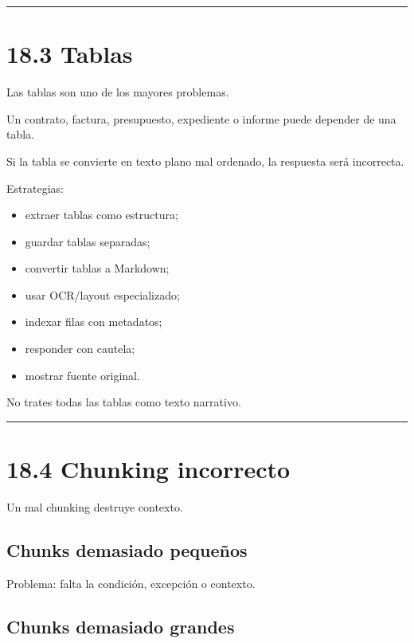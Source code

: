 \begin{center}\rule{0.5\linewidth}{0.5pt}\end{center}

\section{18.3 Tablas}\label{tablas}

Las tablas son uno de los mayores problemas.

Un contrato, factura, presupuesto, expediente o informe puede depender
de una tabla.

Si la tabla se convierte en texto plano mal ordenado, la respuesta será
incorrecta.

Estrategias:

\begin{itemize}
\tightlist
\item
  extraer tablas como estructura;
\item
  guardar tablas separadas;
\item
  convertir tablas a Markdown;
\item
  usar OCR/layout especializado;
\item
  indexar filas con metadatos;
\item
  responder con cautela;
\item
  mostrar fuente original.
\end{itemize}

No trates todas las tablas como texto narrativo.

\begin{center}\rule{0.5\linewidth}{0.5pt}\end{center}

\section{18.4 Chunking incorrecto}\label{chunking-incorrecto}

Un mal chunking destruye contexto.

\subsection{Chunks demasiado
pequeños}\label{chunks-demasiado-pequeuxf1os}

Problema: falta la condición, excepción o contexto.

\subsection{Chunks demasiado grandes}\label{chunks-demasiado-grandes}

